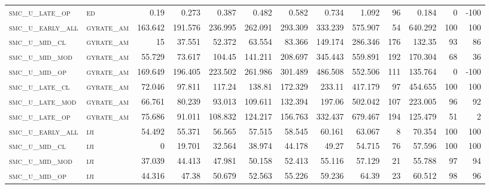 \begin{landscape}
\begin{center}
\begin{footnotesize}
\begin{longtable}{llrrrrrrrr|rrr}
\textsc{smc\_u\_late\_op  } & \textsc{ed        }   & 0.19     & 0.273    & 0.387    & 0.482    & 0.582    & 0.734    & 1.092     & 96     & 0.184         & 0             & -100            \\
\textsc{smc\_u\_early\_all} & \textsc{gyrate\_am}   & 163.642  & 191.576  & 236.995  & 262.091  & 293.309  & 333.239  & 575.907   & 54     & 640.292       & 100           & 100             \\
\textsc{smc\_u\_mid\_cl   } & \textsc{gyrate\_am}   & 15       & 37.551   & 52.372   & 63.554   & 83.366   & 149.174  & 286.346   & 176    & 132.35        & 93            & 86              \\
\textsc{smc\_u\_mid\_mod  } & \textsc{gyrate\_am}   & 55.729   & 73.617   & 104.45   & 141.211  & 208.697  & 345.443  & 559.891   & 192    & 170.304       & 68            & 36              \\
\textsc{smc\_u\_mid\_op   } & \textsc{gyrate\_am}   & 169.649  & 196.405  & 223.502  & 261.986  & 301.489  & 486.508  & 552.506   & 111    & 135.764       & 0             & -100            \\
\textsc{smc\_u\_late\_cl  } & \textsc{gyrate\_am}   & 72.046   & 97.811   & 117.24   & 138.81   & 172.329  & 233.11   & 417.179   & 97     & 454.655       & 100           & 100             \\
\textsc{smc\_u\_late\_mod } & \textsc{gyrate\_am}   & 66.761   & 80.239   & 93.013   & 109.611  & 132.394  & 197.06   & 502.042   & 107    & 223.005       & 96            & 92              \\
\textsc{smc\_u\_late\_op  } & \textsc{gyrate\_am}   & 75.686   & 91.011   & 108.832  & 124.217  & 156.763  & 332.437  & 679.467   & 194    & 125.479       & 51            & 2               \\
\textsc{smc\_u\_early\_all} & \textsc{iji       }   & 54.492   & 55.371   & 56.565   & 57.515   & 58.545   & 60.161   & 63.067    & 8      & 70.354        & 100           & 100             \\
\textsc{smc\_u\_mid\_cl   } & \textsc{iji       }   & 0        & 19.701   & 32.564   & 38.974   & 44.178   & 49.27    & 54.715    & 76     & 57.596        & 100           & 100             \\
\textsc{smc\_u\_mid\_mod  } & \textsc{iji       }   & 37.039   & 44.413   & 47.981   & 50.158   & 52.413   & 55.116   & 57.129    & 21     & 55.788        & 97            & 94              \\
\textsc{smc\_u\_mid\_op   } & \textsc{iji       }   & 44.316   & 47.38    & 50.679   & 52.563   & 55.226   & 59.236   & 64.39     & 23     & 60.512        & 98            & 96              \\

\end{longtable}
\end{footnotesize}
\end{center}
\end{landscape}
